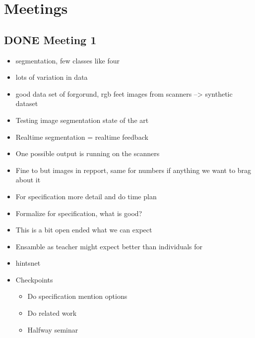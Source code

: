 \documentclass[11pt]{article}
\begin{document}
\section{Meetings}
\label{sec:org9d50474}
\subsection{{\bfseries\sffamily DONE} Meeting 1}
\label{sec:orgb57d439}
\begin{itemize}
\item segmentation, few classes like four
\item lots of variation in data
\item good data set of forgorund, rgb feet images from scanners --> synthetic dataset
\item Testing image segmentation state of the art
\item Realtime segmentation = realtime feedback
\item One possible output is running on the scanners
\item Fine to but images in repport, same for numbers if anything we want to brag about it
\item For specification more detail and do time plan
\item Formalize for specification, what is good?
\item This is a bit open ended what we can expect
\item Ensamble as teacher might expect better than individuals for
\item hintsnet
\item Checkpoints
\begin{itemize}
\item Do specification mention options
\item Do related work
\item Halfway seminar
\end{itemize}
\end{itemize}
\end{document}

